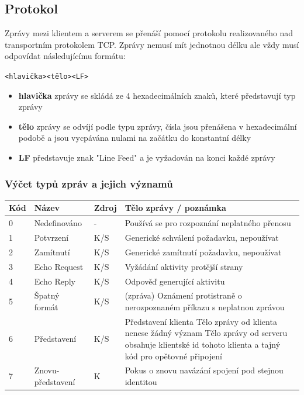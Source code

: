 \documentclass[12pt,a4paper]{article}
\begin{document}
\subsection{Protokol}
Zprávy mezi klientem a serverem se přenáší pomocí protokolu realizovaného nad transportním protokolem TCP. Zprávy nemusí mít jednotnou délku ale vždy musí odpovídat následujícímu formátu:
\begin{center}
\texttt{<hlavička><tělo><LF>}
\end{center}
\begin{itemize}
\setlength\itemsep{0em}
\item \textbf{hlavička} zprávy se skládá ze 4 hexadecimálních znaků, které představují typ zprávy
\item \textbf{tělo} zprávy se odvíjí podle typu zprávy, čísla jsou přenášena v hexadecimální podobě a jsou vycpávána nulami na začátku do konstantní délky
\item \textbf{LF} představuje znak "Line Feed" a je vyžadován na konci každé zprávy
\end{itemize}

\subsubsection{Výčet typů zpráv a jejich významů}
\begin{table}[h]
\center
\begin{tabular}{|l|p{3cm}|l|p{10cm}|}
\hline
\textbf{Kód} & \textbf{Název} & \textbf{Zdroj} & \textbf{Tělo zprávy / poznámka}\\ \hline
0 & Nedefinováno & - & Používá se pro rozpoznání neplatného přenosu \\ \hline
1 & Potvrzení & K/S & Generické schválení požadavku, nepoužívat \\ \hline
2 & Zamítnutí & K/S & Generické zamítnutí požadavku, nepoužívat \\ \hline
3 & Echo Request & K/S & Vyžádání aktivity protější strany \\ \hline
4 & Echo Reply & K/S & Odpověď generující aktivitu \\ \hline
5 & Špatný formát & K/S & (zpráva) Oznámení protistraně o nerozpoznaném příkazu s neplatnou zprávou\\ \hline
6 & Představení & K/S & Představení klienta \newline Tělo zprávy od klienta nenese žádný význam \newline Tělo zprávy od serveru obsahuje klientské id tohoto klienta a tajný kód pro opětovné připojení \\ \hline
7 & Znovu-představení & K & Pokus o znovu navázání spojení pod stejnou identitou \\ \hline

\end{tabular}
\end{table}
\end{document}
